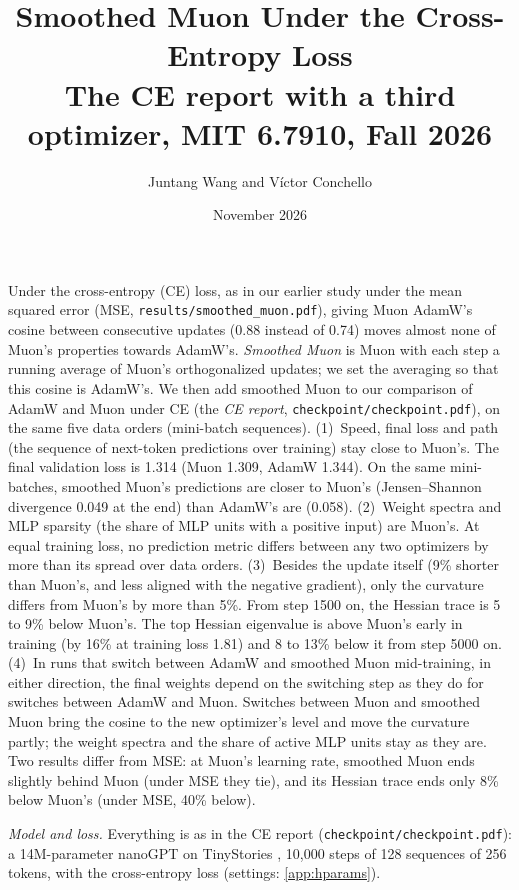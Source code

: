 \documentclass[10pt]{article}
\title{Smoothed Muon Under the Cross-Entropy Loss\\[1pt]
\normalfont The CE report with a third optimizer, MIT 6.7910, Fall 2026}
\author{Juntang Wang and V\'ictor Conchello}
\date{November 2026}
\makeatletter
\renewcommand\paragraph{\@startsection{paragraph}{4}{\z@}{1.0ex \@plus .3ex \@minus .2ex}{-1em}{\normalfont\normalsize\bfseries}}
\renewcommand\maketitle{\begin{center}{\large\bfseries\@title\par}\vspace{3pt}\@author\quad\textperiodcentered\quad\@date\end{center}}
\makeatother
\begin{document}
\maketitle
\vspace{-0.8em}

\paragraph{Summary.} Under the cross-entropy (CE) loss, as in our earlier study under the mean squared error (MSE,
\texttt{results/smoothed\_muon.pdf}), giving Muon AdamW's cosine between consecutive updates (0.88 instead of 0.74)
moves almost none of Muon's properties towards AdamW's. \emph{Smoothed Muon} is Muon with each step a running average
of Muon's orthogonalized updates; we set the averaging so that this cosine is AdamW's. We then add
smoothed Muon to our comparison of AdamW and Muon under CE (the \emph{CE report}, \texttt{checkpoint/checkpoint.pdf}),
on the same five data orders (mini-batch sequences). (1)~Speed, final loss and path (the sequence of next-token predictions over training) stay close to Muon's. The final
validation loss is 1.314 (Muon 1.309, AdamW 1.344). On the same mini-batches, smoothed Muon's predictions are closer
to Muon's (Jensen--Shannon divergence 0.049 at the end) than AdamW's are (0.058). (2)~Weight spectra and MLP sparsity
(the share of MLP units with a positive input) are Muon's. At equal training loss, no
prediction metric differs between any two optimizers by more than its spread over data orders. (3)~Besides the update
itself (9\% shorter than Muon's, and less aligned with the negative gradient), only the curvature differs from
Muon's by more than 5\%. From step 1500 on, the Hessian trace is 5 to 9\% below Muon's. The top Hessian eigenvalue is
above Muon's early in training (by 16\% at training loss 1.81) and 8 to 13\% below it from step 5000 on. (4)~In runs
that switch between AdamW and smoothed Muon mid-training, in either direction, the final weights depend on the
switching step as they do for switches between AdamW and Muon. Switches between Muon and smoothed Muon bring the
cosine to the new optimizer's level and move the curvature partly; the weight spectra and the share of active MLP
units stay as they are. Two results differ from MSE: at
Muon's learning rate, smoothed Muon ends slightly behind Muon (under MSE they tie), and its Hessian trace ends only 8\%
below Muon's (under MSE, 40\% below).

\paragraph{Setup.} \emph{Model and loss.} Everything is as in the CE report (\texttt{checkpoint/checkpoint.pdf}): a
14M-parameter nanoGPT \citep{karpathy2022nanogpt} on TinyStories \citep{eldan2023tinystories}, 10{,}000 steps of 128
sequences of 256 tokens, with the cross-entropy loss (settings: \cref{app:hparams}).
\end{document}
